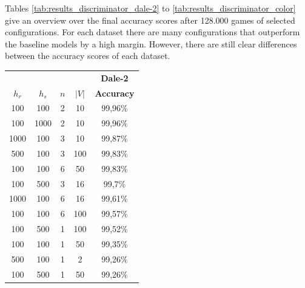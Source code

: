 Tables \ref{tab:results_discriminator_dale-2} to \ref{tab:results_discriminator_color} give an overview over the final accuracy scores after 128.000 games of selected configurations.
For each dataset there are many configurations that outperform the baseline models by a high margin.
However, there are still clear differences between the accuracy scores of each dataset.

\begin{table}[ht]
    \centering
    \begin{tabular}{cccc|c}
        \toprule
                                      &           &     &       & \multicolumn{1}{c}{\textbf{Dale-2}} \\  \cmidrule(lr){5-5}
        $h_r$                         & $h_s$     & $n$ & $|V|$ & \textbf{Accuracy}                   \\\midrule
        {100}                         & {100}     & {2} & {10}  & {99,96\%}                           \\
        {100}                         & {1000}    & {2} & {10}  & {99,96\%}                           \\
        {1000}                        & {100}     & {3} & {10}  & {99,87\%}                           \\
        {500}                         & {100}     & {3} & {100} & {99,83\%}                           \\
        {100}                         & {100}     & {6} & {50}  & {99,83\%}                           \\
        {100}                         & {500}     & {3} & {16}  & {99,7\%}                            \\
        {1000}                        & {100}     & {6} & {16}  & {99,61\%}                           \\
        {100}                         & {100}     & {6} & {100} & {99,57\%}                           \\
        {100}                         & {500}     & {1} & {100} & {99,52\%}                           \\
        {100}                         & {100}     & {1} & {50}  & {99,35\%}                           \\
        {500}                         & {100}     & {1} & {2}   & {99,26\%}                           \\
        {100}                         & {500}     & {1} & {50}  & {99,26\%}                           \\

\end{tabular}
\end{table}
